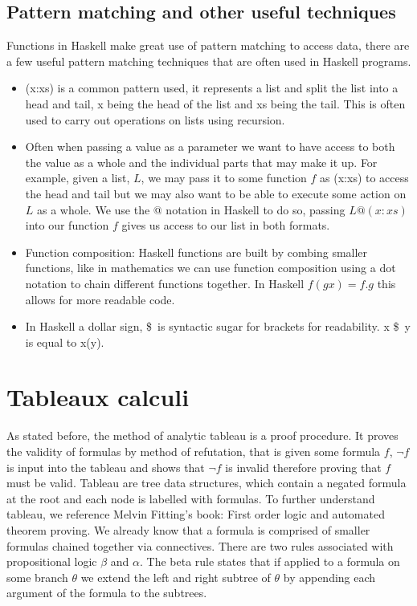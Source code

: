 \documentclass{article}%
\begin{document}
\subsection{Pattern matching and other useful techniques}
Functions in Haskell make great use of pattern matching to access data, there are a few useful pattern matching techniques that are often used in Haskell programs.
\begin{itemize}
\item (x:xs) is a common pattern used, it represents a list and split the list into a head and tail, x being the head of the list and xs being the tail. This is often used to carry out operations on lists using recursion. 
\item Often when passing a value as a parameter we want to have access to both the value as a whole and the individual parts that may make it up. For example, given a list, $L$, we may pass it to some function $f$ as (x:xs) to access the head and tail but we may also want to be able to execute some action on $L$ as a whole. We use the @ notation in Haskell to do so, passing $L@(x:xs)$ into our function $f$ gives us access to our list in both formats. 
\item Function composition: Haskell functions are built by combing smaller functions, like in mathematics we can use function composition using a dot notation to chain different functions together. In Haskell $f (g x) = f . g $ this allows for more readable code. 
\item In Haskell a dollar sign, \$\ is syntactic sugar for brackets for readability. x \$\ y is equal to x(y).
\end{itemize}
\section{Tableaux calculi}
As stated before, the method of analytic tableau is a proof procedure. It proves the validity of formulas by method of refutation, that is given some formula $f$, $\neg{f}$ is input into the tableau and shows that $\neg{f}$ is invalid therefore proving that $f$ must be valid. Tableau are tree data structures, which contain a negated formula at the root and each node is labelled with formulas. To further understand tableau, we reference Melvin Fitting's book: First order logic and automated theorem proving. We already know that a formula is comprised of smaller formulas chained together via connectives. There are two rules associated with propositional logic $\beta$ and $\alpha$.
The beta rule states that if applied to a formula on some branch $\theta$ we extend the left and right subtree of $\theta$ by appending each argument of the formula to the subtrees.
\end{document}
